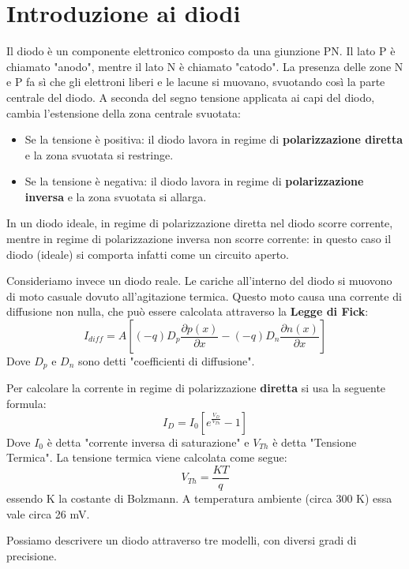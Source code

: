 \documentclass[\main/main.tex]{subfiles}
\begin{document}
\section{Introduzione ai diodi}

Il diodo è un componente elettronico composto da una giunzione PN.
Il lato P è chiamato "anodo", mentre il lato N è chiamato "catodo".
La presenza delle zone N e P fa sì che gli elettroni liberi e le lacune si muovano, svuotando così la parte centrale del diodo.
A seconda del segno tensione applicata ai capi del diodo, cambia l'estensione della zona centrale svuotata:
\begin{itemize}
  \item Se la tensione è positiva: il diodo lavora in regime di \textbf{polarizzazione diretta} e la zona svuotata si restringe.
  \item Se la tensione è negativa: il diodo lavora in regime di \textbf{polarizzazione inversa} e la zona svuotata si allarga.
\end{itemize}
In un diodo ideale, in regime di polarizzazione diretta nel diodo scorre corrente, mentre in regime di polarizzazione inversa non scorre corrente: in questo caso il diodo (ideale) si comporta infatti come un circuito aperto.

Consideriamo invece un diodo reale.
Le cariche all'interno del diodo si muovono di moto casuale dovuto all'agitazione termica. Questo moto causa una corrente di diffusione non nulla, che può essere calcolata attraverso la \textbf{Legge di Fick}:
\[I_{diff} = A \left[(-q)D_p\frac{\partial p(x)}{\partial x} - (-q)D_n\frac{\partial n(x)}{\partial x} \right]\]
Dove  $D_{p}$ e  $D_{n} $ sono detti "coefficienti di diffusione".

Per calcolare la corrente in regime di polarizzazione \textbf{diretta} si usa la seguente formula:
\[I_D = I_0 \left[e^{\frac{V_D}{V_{Th}}}-1 \right]\]
Dove  $I_0$ è detta "corrente inversa di saturazione" e  $V_{Th} $ è detta "Tensione Termica".
La tensione termica viene calcolata come segue:
\[V_{Th} = \frac{KT}{q}\]
essendo K la costante di Bolzmann. A temperatura ambiente (circa 300 K) essa vale circa 26 mV.

Possiamo descrivere un diodo attraverso tre modelli, con diversi gradi di precisione.
\end{document}
